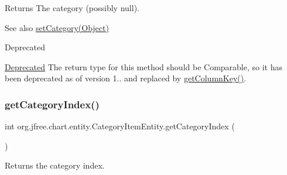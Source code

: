 \begin{DoxyReturn}{Returns}
The category (possibly {\ttfamily null}).
\end{DoxyReturn}
\begin{DoxySeeAlso}{See also}
\mbox{\hyperlink{classorg_1_1jfree_1_1chart_1_1entity_1_1_category_item_entity_a23d787fb513e3f167b91eea19732214e}{set\+Category(\+Object)}}
\end{DoxySeeAlso}
\begin{DoxyRefDesc}{Deprecated}
\item[\mbox{\hyperlink{deprecated__deprecated000043}{Deprecated}}]The return type for this method should be {\ttfamily Comparable}, so it has been deprecated as of version 1.. and replaced by \mbox{\hyperlink{classorg_1_1jfree_1_1chart_1_1entity_1_1_category_item_entity_a8c5694b51e2b552e71fc31ef3a291b80}{get\+Column\+Key()}}. \end{DoxyRefDesc}
\mbox{\label{classorg_1_1jfree_1_1chart_1_1entity_1_1_category_item_entity_ab7478ee780434b41127a0b3ac87887dc}} 
\subsubsection{\texorpdfstring{get\+Category\+Index()}{getCategoryIndex()}}
{\footnotesize\ttfamily int org.\+jfree.\+chart.\+entity.\+Category\+Item\+Entity.\+get\+Category\+Index (\begin{DoxyParamCaption}{ }\end{DoxyParamCaption})}

Returns the category index.

